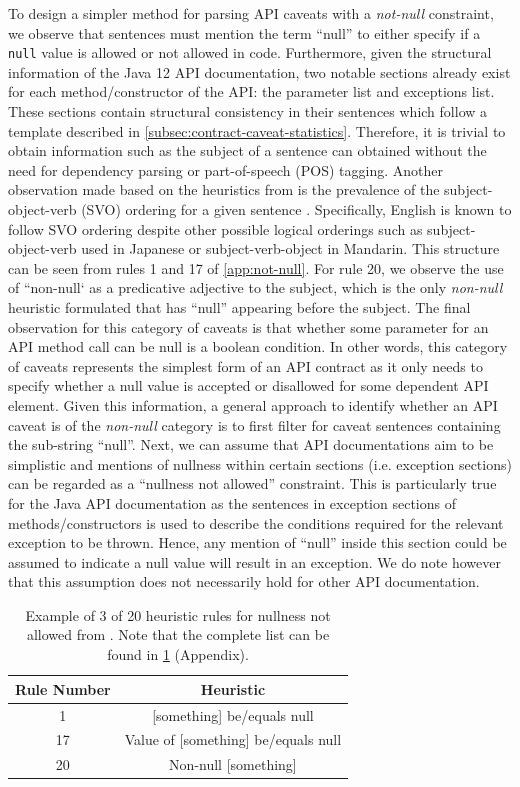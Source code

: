 To design a simpler method for parsing API caveats with a \textit{not-null} constraint, we observe that sentences must mention the term ``null'' to either specify if a \lstinline{null} value is allowed or not allowed in code. Furthermore, given the structural information of the Java 12 API documentation, two notable sections already exist for each method/constructor of the API: the parameter list and exceptions list. These sections contain structural consistency in their sentences which follow a template described in \ref{subsec:contract-caveat-statistics}. Therefore, it is trivial to obtain information such as the subject of a sentence can obtained without the need for dependency parsing or part-of-speech (POS) tagging. Another observation made based on the heuristics from \cite{zhou-directive} is the prevalence of the subject-object-verb (SVO) ordering for a given sentence \cite{dryer200581}. Specifically, English is known to follow SVO ordering despite other possible logical orderings such as subject-object-verb used in Japanese or subject-verb-object in Mandarin. This structure can be seen from rules 1 and 17 of \ref{app:not-null}. For rule 20, we observe the use of ``non-null` as a predicative adjective to the subject, which is the only \textit{non-null} heuristic formulated that has ``null'' appearing before the subject. The final observation for this category of caveats is that whether some parameter for an API method call can be null is a boolean condition. In other words, this category of caveats represents the simplest form of an API contract as it only needs to specify whether a null value is accepted or disallowed for some dependent API element. Given this information, a general approach to identify whether an API caveat is of the \textit{non-null} category is to first filter for caveat sentences containing the sub-string ``null''. Next, we can assume that API documentations aim to be simplistic and mentions of nullness within certain sections (i.e. exception sections) can be regarded as a ``nullness not allowed'' constraint. This is particularly true for the Java API documentation as the sentences in exception sections of methods/constructors is used to describe the conditions required for the relevant exception to be thrown. Hence, any mention of ``null'' inside this section could be assumed to indicate a null value will result in an exception. We do note however that this assumption does not necessarily hold for other API documentation. \\

\begin{table}[]
	\begin{tabular}{|cc|}
		\hline
		Rule Number & Heuristic \\ \hline
		1 & [something] be/equals null \\
		17 & Value of [something] be/equals null \\
		20 & Non-null [something] \\ \hline
	\end{tabular}
	\caption{Example of 3 of 20 heuristic rules for nullness not allowed from \cite{zhou-directive}. Note that the complete list can be found in \ref{tab:not-null-heuristic} (Appendix).}
	\label{tab:not-null-heuristic}
\end{table}

